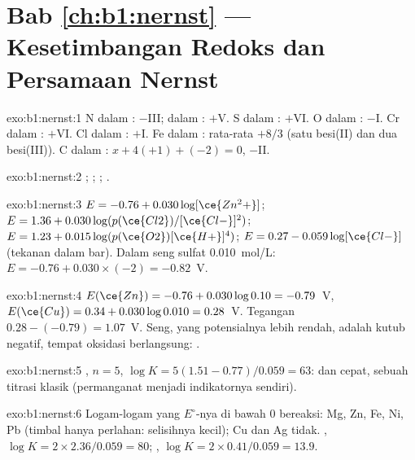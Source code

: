 \section*{Bab \ref{ch:b1:nernst} --- Kesetimbangan Redoks dan Persamaan Nernst}

\begin{solution}{exo:b1:nernst:1}
N dalam : $-$III; dalam : $+$V. S dalam :
$+$VI. O dalam : $-$I. Cr dalam : $+$VI. Cl dalam
: $+$I. Fe dalam : rata-rata $+8/3$ (satu besi(II) dan
dua besi(III)). C dalam : $x + 4(+1) + (-2) = 0$, $-$II.
\end{solution}

\begin{solution}{exo:b1:nernst:2}
;
;
;
.
\end{solution}

\begin{solution}{exo:b1:nernst:3}
$E = -0.76 + 0.030\log[\ce{Zn^2+}]$; $E = 1.36 + 0.030\log(p(\ce{Cl2})/[\ce{Cl-}]^2)$;
$E = 1.23 + 0.015\log(p(\ce{O2})[\ce{H+}]^4)$; $E = 0.27 - 0.059\log[\ce{Cl-}]$
(tekanan dalam bar). Dalam seng sulfat \qty{0.010}{mol/L}:
$E = -0.76 + 0.030 \times (-2) = -0.82$~V.
\end{solution}

\begin{solution}{exo:b1:nernst:4}
$E(\ce{Zn}) = -0.76 + 0.030\log 0.10 = -0.79$~V, $E(\ce{Cu}) = 0.34 +
0.030\log 0.010 = 0.28$~V. Tegangan $0.28 - (-0.79) = 1.07$~V. Seng, yang
potensialnya lebih rendah, adalah kutub negatif, tempat oksidasi
berlangsung: .
\end{solution}

\begin{solution}{exo:b1:nernst:5}
, $n = 5$,
$\log K = 5(1.51 - 0.77)/0.059 = 63$:  dan cepat, sebuah
titrasi klasik (permanganat menjadi indikatornya sendiri).
\end{solution}

\begin{solution}{exo:b1:nernst:6}
Logam-logam yang $E^\circ$-nya di bawah 0 bereaksi: Mg, Zn, Fe, Ni, Pb
(timbal hanya perlahan: selisihnya kecil); Cu dan Ag tidak. , $\log K = 2 \times 2.36/0.059 = 80$;
, $\log K = 2 \times 0.41/0.059 = 13.9$.
\end{solution}

